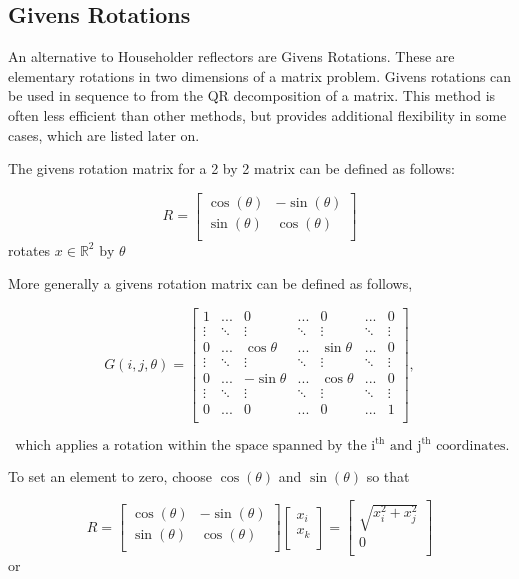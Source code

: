 \documentclass{article}
\begin{document}
\subsection{Givens Rotations}
An alternative to Householder reflectors are Givens Rotations. These are elementary rotations in two dimensions of a matrix problem. Givens rotations can be used in sequence to from the QR decomposition of a matrix. This method is often less efficient than other methods, but provides additional flexibility in some cases, which are listed later on. 


The givens rotation matrix for a 2 by 2 matrix can be defined as follows:

$$
R= \left [\begin{array}{cc}
\cos(\theta) & -\sin(\theta) \\
\sin(\theta) & \cos(\theta) \\
\end{array}\right]
$$ 
rotates $x \in \mathbb{R}^{2} \text{ by } \theta$

More generally a givens rotation matrix can be defined as follows,

$$
G(i,j,\theta) = \left [\begin{array}{ccccccc}
1 & ... & 0 & ... & 0 &... & 0 \\ 
\vdots & \ddots & \vdots & \ddots & \vdots & \ddots & \vdots \\ 
0 & ... & \cos \theta & ... & \sin \theta &... & 0 \\ 
\vdots & \ddots & \vdots & \ddots & \vdots & \ddots & \vdots \\ 
0 & ... & -\sin \theta & ... & \cos \theta &... & 0 \\ 
\vdots & \ddots & \vdots & \ddots & \vdots & \ddots & \vdots \\ 
0 & ... & 0 & ... & 0 &... & 1 \\ 
\end{array}\right], 
$$

$$
\text{ which applies a rotation within the space spanned by the } \text{i}^\text{th} 
\text{ and } \text{j}^\text{th} \text{ coordinates.}
$$



To set an element to zero, choose $\cos(\theta)$ and $\sin(\theta)$ so that


$$
R= \left [\begin{array}{cc}
\cos(\theta) & -\sin(\theta) \\
\sin(\theta) & \cos(\theta) \\
\end{array}\right] \left [\begin{array}{c}
x_{i} \\
x_{k} \\
\end{array}\right] =  \left [\begin{array}{c}
\sqrt{x_{i}^{2}+x_{j}^{2}} \\
0 \\
\end{array}\right]
$$ or
\end{document}
